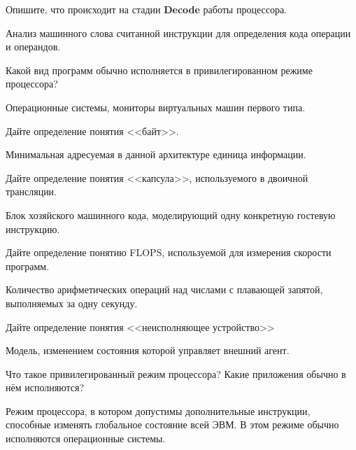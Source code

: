 \documentclass[a4paper, addpoints]{exam}
\begin{document}
\begin{questions}

\question[3] Опишите, что происходит на стадии \textbf{Decode} работы процессора.
\begin{solution}[1cm]
Анализ машинного слова считанной инструкции для определения кода операции и операндов.
\end{solution}




\question[3] Какой вид программ обычно исполняется в привилегированном режиме процессора?
\begin{solution}[1cm]
Операционные системы, мониторы виртуальных машин первого типа.
\end{solution}

\question[3] Дайте определение понятия <<байт>>.
\begin{solution}[1cm]
Минимальная адресуемая в данной архитектуре единица информации.
\end{solution}

\question[3] Дайте определение понятия <<капсула>>, используемого в двоичной трансляции.
\begin{solution}[1cm]
Блок хозяйского машинного кода, моделирующий одну конкретную гостевую инструкцию.
\end{solution}
    
\question[3] Дайте определение понятию FLOPS, используемой для измерения скорости программ.
\begin{solution}[1cm]
Количество арифметических операций над числами с плавающей запятой, выполняемых за одну секунду.
\end{solution}

\question[3] Дайте определение понятия <<неисполняющее устройство>>
\begin{solution}[2cm]
Модель, изменением состояния которой управляет внешний агент.
\end{solution}

\question[3] Что такое привилегированный режим процессора? Какие приложения обычно в нём исполняются?
\begin{solution}[2cm]
Режим процессора, в котором допустимы дополнительные инструкции, способные изменять глобальное состояние всей ЭВМ. В этом режиме обычно исполняются операционные системы.
\end{solution}


\end{questions}
\end{document}
